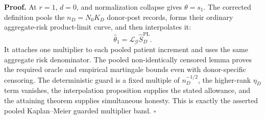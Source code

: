 \textbf{Proof.}
At \(r=1\), \(d=0\), and normalization collapse gives \(\theta=s_1\). The corrected definition pools the \(n_D=N_0K_D\) donor-post records, forms their ordinary aggregate-risk product-limit curve, and then interpolates it:
\[
 \widehat\theta_1=\mathcal L_{\mathcal G}\widehat S_D^{\mathrm{PL}}. \tag{1}
\]
It attaches one multiplier to each pooled patient increment and uses the same aggregate risk denominator. The pooled non-identically censored lemma proves the required oracle and empirical martingale bounds even with donor-specific censoring. The deterministic guard is a fixed multiple of \(n_D^{-1/2}\), the higher-rank \(\eta_D\) term vanishes, the interpolation proposition supplies the stated allowance, and the attaining theorem supplies simultaneous honesty. This is exactly the asserted pooled Kaplan--Meier guarded multiplier band. \(\square\)